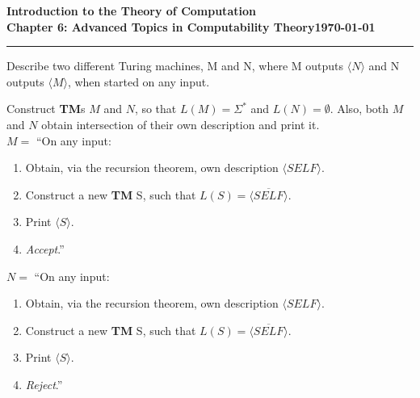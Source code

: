 \documentclass[11pt]{article}
\newcommand{\dated}{\today}
\begin{document}
\textbf{Introduction to the Theory of
Computation}\hfill\textbf{\myname}\\[0.01in]
\textbf{Chapter 6: Advanced Topics in Computability Theory}\hfill\textbf{\dated}\\
\smallskip\hrule\bigskip

\begin{problem}{6.6}
Describe two different Turing machines, M and N, where M outputs $\langle N \rangle$ and N outputs $\langle M \rangle$, when started on any input.
\end{problem}

\begin{solution} Construct \textbf{TM}s $M$ and $N$, so that $L(M) = \Sigma^{*}$ and $L(N) = \emptyset$. Also, both $M$ and $N$ obtain intersection of their own description and print it. \\

$M =$ \textquotedblleft On any input:
\begin{enumerate}
\item Obtain, via the recursion theorem, own description $\langle SELF \rangle$.
\item Construct a new \textbf{TM} S, such that $L(S) = \overline{\langle SELF \rangle} $.
\item Print $\langle S \rangle$.
\item \textit{Accept}.\textquotedblright
\end{enumerate}

$N =$ \textquotedblleft On any input:
\begin{enumerate}
\item Obtain, via the recursion theorem, own description $\langle SELF \rangle$.
\item Construct a new \textbf{TM} S, such that $L(S) = \overline{\langle SELF \rangle} $.
\item Print $\langle S \rangle$.
\item \textit{Reject}.\textquotedblright
\end{enumerate}
\end{solution}
\end{document}
